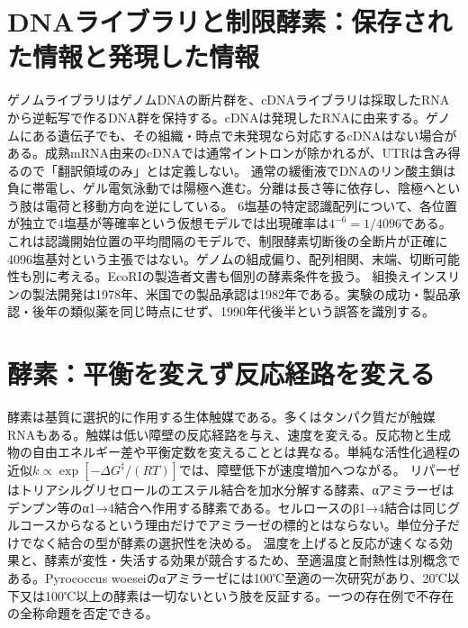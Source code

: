 \section{DNAライブラリと制限酵素：保存された情報と発現した情報}
\label{theory:biology:libraries}
ゲノムライブラリはゲノムDNAの断片群を、cDNAライブラリは採取したRNAから逆転写で作るDNA群を保持する。cDNAは発現したRNAに由来する\autocite{nhgri_cdna}。ゲノムにある遺伝子でも、その組織・時点で未発現なら対応するcDNAはない場合がある。成熟mRNA由来のcDNAでは通常イントロンが除かれるが、UTRは含み得るので「翻訳領域のみ」とは定義しない。
通常の緩衝液でDNAのリン酸主鎖は負に帯電し、ゲル電気泳動では陽極へ進む。分離は長さ等に依存し、陰極へという肢は電荷と移動方向を逆にしている。
6塩基の特定認識配列について、各位置が独立で4塩基が等確率という仮想モデルでは出現確率は\(4^{-6}=1/4096\)である。これは認識開始位置の平均間隔のモデルで、制限酵素切断後の全断片が正確に4096塩基対という主張ではない。ゲノムの組成偏り、配列相関、末端、切断可能性も別に考える。EcoRIの製造者文書も個別の酵素条件を扱う\autocite{neb_ecori}。
組換えインスリンの製法開発は1978年、米国での製品承認は1982年である\autocite{fda_insulin}。実験の成功・製品承認・後年の類似薬を同じ時点にせず、1990年代後半という誤答を識別する。

\section{酵素：平衡を変えず反応経路を変える}
\label{theory:biology:enzymes}
酵素は基質に選択的に作用する生体触媒である。多くはタンパク質だが触媒RNAもある。触媒は低い障壁の反応経路を与え、速度を変える。反応物と生成物の自由エネルギー差や平衡定数を変えることとは異なる。単純な活性化過程の近似\(k\propto\exp[-\Delta G^\ddagger/(RT)]\)では、障壁低下が速度増加へつながる。
リパーゼはトリアシルグリセロールのエステル結合を加水分解する酵素、αアミラーゼはデンプン等のα1→4結合へ作用する酵素である\autocite{iubmb_lipase,iubmb_amylase}。セルロースのβ1→4結合は同じグルコースからなるという理由だけでアミラーゼの標的とはならない。単位分子だけでなく結合の型が酵素の選択性を決める。
温度を上げると反応が速くなる効果と、酵素が変性・失活する効果が競合するため、至適温度と耐熱性は別概念である。Pyrococcus woeseiのαアミラーゼには100℃至適の一次研究があり、20℃以下又は100℃以上の酵素は一切ないという肢を反証する\autocite{hyper_amylase}。一つの存在例で不存在の全称命題を否定できる。

